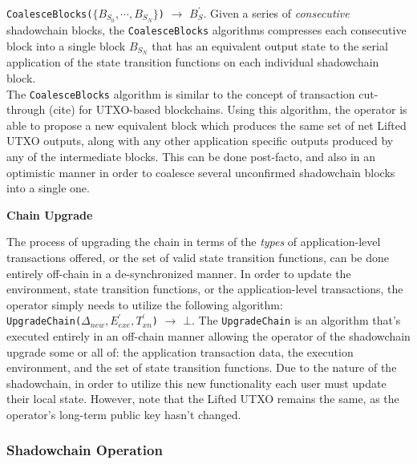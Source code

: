 \documentclass[10pt,a4paper]{article}
\theoremstyle{definition}
\begin{document}
\texttt{CoalesceBlocks($\{B_{S_0}, \cdots, B_{S_N}\}$)} $\rightarrow$
$B_{S}^\prime$. Given a series of \emph{consecutive} shadowchain blocks, the
\texttt{CoalesceBlocks} algorithms compresses each consecutive block into a
single block $B_{S_N}$ that has an equivalent output state to the serial
application of the state transition functions on each individual shadowchain
block. \\

The \texttt{CoalesceBlocks} algorithm is similar to the concept of transaction
cut-through (cite) for UTXO-based blockchains. Using this algorithm, the
operator is able to propose a new equivalent block which produces the same set
of net Lifted UTXO outputs, along with any other application specific outputs
produced by any of the intermediate blocks. This can be done post-facto, and
also in an optimistic manner in order to coalesce several unconfirmed
shadowchain blocks into a single one.




\begin{center}
    \textbf{Chain Upgrade}
\end{center}

The process of upgrading the chain in terms of the \emph{types} of
application-level transactions offered, or the set of valid state transition
functions, can be done entirely off-chain in a de-synchronized manner. In order to
update the environment, state transition functions, or the application-level
transactions, the operator simply needs to utilize the following algorithm: \\

\texttt{UpgradeChain($\Delta_{new}, E_{exe}^\prime, T_{xn}^\prime$)}
$\rightarrow$ $\bot$. The \texttt{UpgradeChain} is an algorithm that's executed
entirely in an off-chain manner allowing the operator of the shadowchain
upgrade some or all of: the application transaction data, the execution
environment, and the set of state transition functions. Due to the nature of
the shadowchain, in order to utilize this new functionality each user must
update their local state. However, note that the Lifted UTXO remains the same,
as the operator's long-term public key hasn't changed.

\subsubsection{Shadowchain Operation}
\end{document}
